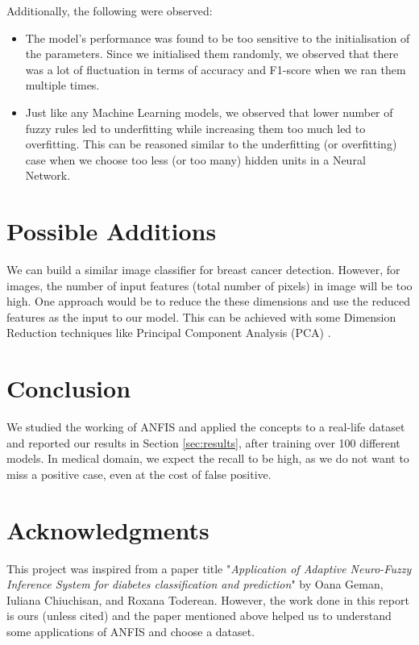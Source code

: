 \documentclass[11pt,a4paper]{article}
\begin{document}
Additionally, the following were observed:
\begin{itemize}
    \item The model's performance was found to be too sensitive to the initialisation of the parameters. Since we initialised them randomly, we observed that there was a lot of fluctuation in terms of accuracy and F1-score when we ran them multiple times.
    \item Just like any Machine Learning models, we observed that lower number of fuzzy rules led to underfitting while increasing them too much led to overfitting. This can be reasoned similar to the underfitting (or overfitting) case when we choose too less (or too many) hidden units in a Neural Network.
\end{itemize}




\section{Possible Additions}
We can build a similar image classifier for breast cancer detection. However, for images, the number of input features (total number of pixels) in image will be too high. One approach would be to reduce the these dimensions and use the reduced features as the input to our model. This can be achieved with some Dimension Reduction techniques like Principal Component Analysis (PCA) \cite{PCA:12}. 


\section{Conclusion}
We studied the working of ANFIS and applied the concepts to a real-life dataset and reported our results in Section \ref{sec:results}, after training over 100 different models. In medical domain, we expect the recall to be high, as we do not want to miss a positive case, even at the cost of false positive.

\cleardoublepage

\section*{Acknowledgments}
This project was inspired from a paper title "{\em Application of Adaptive Neuro-Fuzzy Inference System for diabetes classification and prediction}" by Oana Geman, Iuliana Chiuchisan, and Roxana Toderean. However, the work done in this report is ours (unless cited) and the paper mentioned above helped us to understand some applications of ANFIS and choose a dataset.



\end{document}
